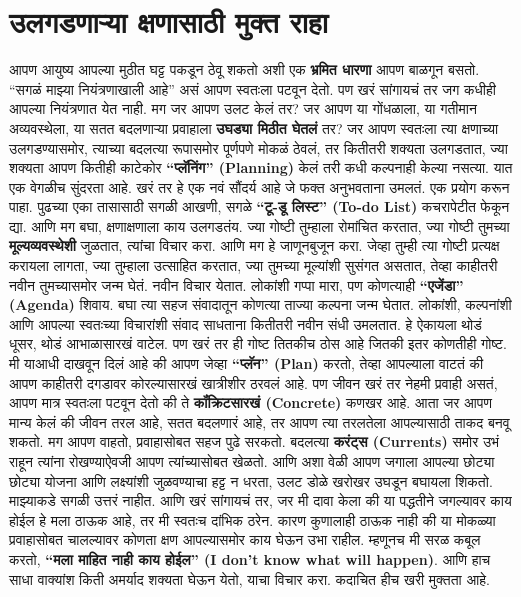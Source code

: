  \chapter{उलगडणाऱ्या क्षणासाठी मुक्त राहा}
आपण आयुष्य आपल्या मुठीत घट्ट पकडून ठेवू शकतो अशी एक \textbf{भ्रमित धारणा} आपण बाळगून बसतो. “सगळं माझ्या नियंत्रणाखाली आहे” असं आपण स्वतःला पटवून देतो. पण खरं सांगायचं तर जग कधीही आपल्या नियंत्रणात येत नाही. मग जर आपण उलट केलं तर? जर आपण या गोंधळाला, या गतीमान अव्यवस्थेला, या सतत बदलणाऱ्या प्रवाहाला \textbf{उघड्या मिठीत घेतलं} तर?
जर आपण स्वतःला त्या क्षणाच्या उलगडण्यासमोर, त्याच्या बदलत्या रूपासमोर पूर्णपणे मोकळं ठेवलं, तर कितीतरी शक्यता उलगडतात, ज्या शक्यता आपण कितीही काटेकोर \textbf{“प्लॅनिंग” (Planning)} केलं तरी कधी कल्पनाही केल्या नसत्या.
यात एक वेगळीच सुंदरता आहे. खरं तर हे एक नवं सौंदर्य आहे जे फक्त अनुभवताना उमलतं.
एक प्रयोग करून पाहा. पुढच्या एका तासासाठी सगळी आखणी, सगळे \textbf{“टू-डू लिस्ट” (To-do List)} कचरापेटीत फेकून द्या. आणि मग बघा, क्षणाक्षणाला काय उलगडतंय. ज्या गोष्टी तुम्हाला रोमांचित करतात, ज्या गोष्टी तुमच्या \textbf{मूल्यव्यवस्थेशी} जुळतात, त्यांचा विचार करा. आणि मग हे जाणूनबुजून करा.
जेव्हा तुम्ही त्या गोष्टी प्रत्यक्ष करायला लागता, ज्या तुम्हाला उत्साहित करतात, ज्या तुमच्या मूल्यांशी सुसंगत असतात, तेव्हा काहीतरी नवीन तुमच्यासमोर जन्म घेतं. नवीन विचार येतात. लोकांशी गप्पा मारा, पण कोणत्याही \textbf{“एजेंडा” (Agenda)} शिवाय. बघा त्या सहज संवादातून कोणत्या ताज्या कल्पना जन्म घेतात. लोकांशी, कल्पनांशी आणि आपल्या स्वतःच्या विचारांशी संवाद साधताना कितीतरी नवीन संधी उमलतात.
हे ऐकायला थोडं धूसर, थोडं आभाळासारखं वाटेल. पण खरं तर ही गोष्ट तितकीच ठोस आहे जितकी इतर कोणतीही गोष्ट. मी याआधी दाखवून दिलं आहे की आपण जेव्हा \textbf{“प्लॅन” (Plan)} करतो, तेव्हा आपल्याला वाटतं की आपण काहीतरी दगडावर कोरल्यासारखं खात्रीशीर ठरवलं आहे. पण जीवन खरं तर नेहमी प्रवाही असतं, आपण मात्र स्वतःला पटवून देतो की ते \textbf{कॉंक्रिटसारखं (Concrete)} कणखर आहे.
आता जर आपण मान्य केलं की जीवन तरल आहे, सतत बदलणारं आहे, तर आपण त्या तरलतेला आपल्यासाठी ताकद बनवू शकतो. मग आपण वाहतो, प्रवाहासोबत सहज पुढे सरकतो. बदलत्या \textbf{करंट्स (Currents)} समोर उभं राहून त्यांना रोखण्याऐवजी आपण त्यांच्यासोबत खेळतो. आणि अशा वेळी आपण जगाला आपल्या छोट्या छोट्या योजना आणि लक्ष्यांशी जुळवण्याचा हट्ट न धरता, उलट डोळे खरोखर उघडून बघायला शिकतो.
माझ्याकडे सगळी उत्तरं नाहीत. आणि खरं सांगायचं तर, जर मी दावा केला की या पद्धतीने जगल्यावर काय होईल हे मला ठाऊक आहे, तर मी स्वतःच दांभिक ठरेन. कारण कुणालाही ठाऊक नाही की या मोकळ्या प्रवाहासोबत चालल्यावर कोणता क्षण आपल्यासमोर काय घेऊन उभा राहील.
म्हणूनच मी सरळ कबूल करतो, \textbf{“मला माहित नाही काय होईल” (I don’t know what will happen)}. आणि हाच साधा वाक्यांश किती अमर्याद शक्यता घेऊन येतो, याचा विचार करा. कदाचित हीच खरी मुक्तता आहे.
